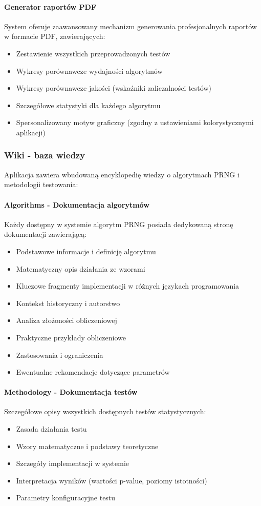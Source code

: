 \documentclass[12pt,a4paper]{article}
\begin{document}
\paragraph{Generator raportów PDF}
System oferuje zaawansowany mechanizm generowania profesjonalnych raportów w formacie PDF, zawierających:
\begin{itemize}
    \item Zestawienie wszystkich przeprowadzonych testów
    \item Wykresy porównawcze wydajności algorytmów
    \item Wykresy porównawcze jakości (wskaźniki zaliczalności testów)
    \item Szczegółowe statystyki dla każdego algorytmu
    \item Spersonalizowany motyw graficzny (zgodny z ustawieniami kolorystycznymi aplikacji)
\end{itemize}

\subsubsection{Wiki - baza wiedzy}

Aplikacja zawiera wbudowaną encyklopedię wiedzy o algorytmach PRNG i metodologii testowania:

\paragraph{Algorithms - Dokumentacja algorytmów}
Każdy dostępny w systemie algorytm PRNG posiada dedykowaną stronę dokumentacji zawierającą:
\begin{itemize}
    \item Podstawowe informacje i definicję algorytmu
    \item Matematyczny opis działania ze wzorami
    \item Kluczowe fragmenty implementacji w różnych językach programowania
    \item Kontekst historyczny i autorstwo
    \item Analiza złożoności obliczeniowej
    \item Praktyczne przykłady obliczeniowe
    \item Zastosowania i ograniczenia
    \item Ewentualne rekomendacje dotyczące parametrów
\end{itemize}

\paragraph{Methodology - Dokumentacja testów}
Szczegółowe opisy wszystkich dostępnych testów statystycznych:
\begin{itemize}
    \item Zasada działania testu
    \item Wzory matematyczne i podstawy teoretyczne
    \item Szczegóły implementacji w systemie
    \item Interpretacja wyników (wartości p-value, poziomy istotności)
    \item Parametry konfiguracyjne testu
\end{itemize}
\end{document}
